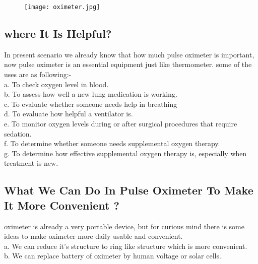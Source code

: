 \documentclass[12pt]{article}
\begin{document}
\begin{figure}[h]
\texttt{[image: oximeter.jpg]}
\centering
\end{figure}

\subsection{where It Is Helpful?}

In present scenario we already know that how much pulse oximeter is important, now pulse oximeter is an essential equipment just like thermometer.
some of the uses are as following:-\\


a. To check oxygen level in blood.\\

b. To assess how well a new lung medication is working.\\

c. To evaluate whether someone needs help in breathing\\

d. To evaluate how helpful a ventilator is.\\

e. To monitor oxygen levels during or after surgical      procedures that require sedation.\\

f. To determine whether someone needs supplemental oxygen      
  therapy.\\
  
g. To determine how effective supplemental oxygen therapy is, especially when treatment is new.




\subsection{What We Can Do In Pulse Oximeter To Make It More Convenient ?}


oximeter is already a very portable device, but for curious mind there is some ideas to make oximeter more daily usable and convenient.\\




a. We can reduce it's structure to ring like structure which is more convenient.\\


b. We can replace battery of oximeter by human voltage or solar cells.\\
\end{document}
